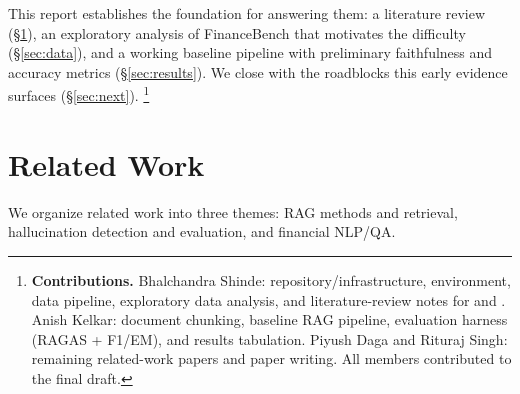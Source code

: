 \documentclass[11pt]{article}
\begin{document}
This report establishes the foundation for answering them: a literature review
(\S\ref{sec:related}), an exploratory analysis of FinanceBench that motivates
the difficulty (\S\ref{sec:data}), and a working baseline pipeline with
preliminary faithfulness and accuracy metrics (\S\ref{sec:results}). We close
with the roadblocks this early evidence surfaces (\S\ref{sec:next}).%
\footnote{\textbf{Contributions.} Bhalchandra Shinde: repository/infrastructure,
environment, data pipeline, exploratory data analysis, and literature-review
notes for \citet{lewis2020rag} and \citet{islam2023financebench}. Anish Kelkar:
document chunking, baseline RAG pipeline, evaluation harness (RAGAS + F1/EM), and
results tabulation. Piyush Daga and Rituraj Singh: remaining related-work papers
and paper writing. All members contributed to the final draft.}

\section{Related Work}
\label{sec:related}
We organize related work into three themes: RAG methods and retrieval,
hallucination detection and evaluation, and financial NLP/QA.
\end{document}
